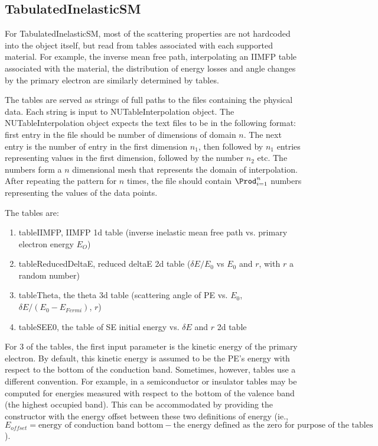 \subsection{TabulatedInelasticSM}
For TabulatedInelasticSM, most of the scattering properties are not hardcoded into the object itself, but read from tables associated with each supported material. For example, the inverse mean free path, interpolating an IIMFP table associated with the material, the distribution of energy losses and angle changes by the primary electron are similarly determined by tables. 

The tables are served as strings of full paths to the files containing the physical data. Each string is input to NUTableInterpolation object. The NUTableInterpolation object expects the text files to be in the following format: first entry in the file should be number of dimensions of domain $n$. The next entry is the number of entry in the first dimension $n_1$, then followed by $n_1$ entries representing values in the first dimension, followed by the number $n_2$ etc. The numbers form a $n$ dimensional mesh that represents the domain of interpolation. After repeating the pattern for $n$ times, the file should contain $\Prod_{i=1}^{n}$ numbers representing the values of the data points. 

The tables are:
\begin{enumerate}
    \item tableIIMFP, IIMFP 1d table (inverse inelastic mean free path vs. primary electron energy $E_O$)
    \item tableReducedDeltaE, reduced deltaE 2d table ($\delta E/E_0$ vs $E_0$ and $r$, with $r$ a random number)
    \item tableTheta, the theta 3d table (scattering angle of PE vs. $E_0$, $\delta E/(E_0-E_{Fermi})$, $r$)
    \item tableSEE0, the table of SE initial energy vs. $\delta E$ and $r$
2d table
\end{enumerate}

For 3 of the tables, the first input parameter is the kinetic energy of the primary electron. By default, this kinetic energy is assumed to be the PE's energy with respect to the bottom of the conduction band. Sometimes, however, tables use a different convention. For example, in a semiconductor or insulator tables may be computed for energies measured with respect to the bottom of the valence band (the highest occupied band). This can be accommodated by providing the constructor with the energy offset between these two definitions of energy (ie., $E_{offset} = \text{energy of conduction band bottom} - \text{the energy defined as the zero for purpose of the tables}$).

